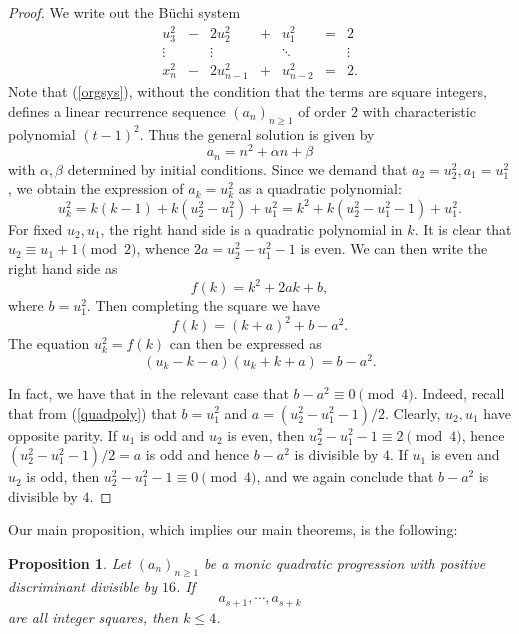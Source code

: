 \documentclass[letterpaper,10pt]{amsart}
\newtheorem{proposition}[theorem]{Proposition}
\theoremstyle{definition}
\numberwithin{equation}{section}
\begin{document}
\begin{proof}
	
	We write out the B\"{u}chi system
	\begin{equation} \label{orgsys} \begin{matrix} u_3^2 & - & 2 u_2^2 & + & u_1^2 & = & 2 \\ \vdots & & \vdots & & \ddots &  &  \vdots \\ x_{n}^2 & - & 2 u_{n-1}^2 & + & u_{n-2}^2 & = & 2.\end{matrix} 
	\end{equation}
	Note that (\ref{orgsys}), without the condition that the terms are square integers, defines a linear recurrence sequence $(a_n)_{n \geq 1}$ of order $2$ with characteristic polynomial $(t-1)^2$. Thus the general solution is given by 
	\[a_n = n^2 + \alpha n + \beta\]
	with $\alpha, \beta$ determined by initial conditions. Since we demand that $a_2 = u_2^2, a_1 = u_1^2$, we obtain the expression of $a_k = u_k^2$ as a quadratic polynomial: 
	\begin{equation} \label{quadpoly} u_k^2 = k(k-1) + k(u_2^2 - u_1^2) + u_1^2 = k^2 + k(u_2^2 - u_1^2 - 1) + u_1^2.
	\end{equation}
	For fixed $u_2, u_1$, the right hand side is a quadratic polynomial in $k$. It is clear that $u_2 \equiv u_1 + 1 \pmod{2}$, whence $2a = u_2^2 - u_1^2 - 1$ is even. We can then write the right hand side as 
	\[f(k) = k^2 + 2ak + b,\]
	where $b = u_1^2$. Then completing the square we have 
	\[f(k) = (k+a)^2 + b - a^2.\]
	The equation $u_k^2 = f(k)$ can then be expressed as 
	\[(u_k - k - a)(u_k + k + a) = b - a^2.\]
	
	
	In fact, we have that in the relevant case that $b - a^2 \equiv 0 \pmod{4}$. Indeed, recall that from (\ref{quadpoly}) that $b = u_1^2$ and $a = (u_2^2 - u_1^2 - 1)/2$. Clearly, $u_2, u_1$ have opposite parity. If $u_1$ is odd and $u_2$ is even, then $u_2^2 - u_1^2 - 1 \equiv 2 \pmod{4}$, hence $(u_2^2 - u_1^2 - 1)/2 = a$ is odd and hence $b - a^2$ is divisible by $4$. If $u_1$ is even and $u_2$ is odd, then $u_2^2 - u_1^2 - 1 \equiv 0 \pmod{4}$, and we again conclude that $b - a^2$ is divisible by $4$. \end{proof}
		
Our main proposition, which implies our main theorems, is the following:

\begin{proposition} \label{mainprop} Let $(a_n)_{n \geq 1}$ be a monic quadratic progression with positive discriminant divisible by $16$. If 
\[a_{s+1}, \cdots, a_{s+k}\]
are all integer squares, then $k \leq 4$. 
\end{proposition} 	
\end{document}
